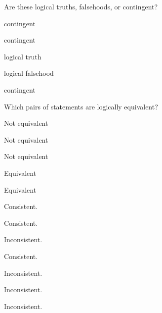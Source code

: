 \documentclass[PHIL101-Textbook.tex]{subfiles}
\begin{document}
Are these logical truths,  falsehoods, or contingent?
\begin{earg}
\item contingent %
\item contingent %
\item logical truth %
\item logical falsehood %
\item contingent %
\end{earg}

Which pairs of statements are logically equivalent?
\begin{earg}
\item Not equivalent %
\item Not equivalent %
\item Not equivalent %
\item Equivalent %
\item Equivalent %
\end{earg}


\begin{earg}
\item Consistent. %
\item Consistent. %
\item Inconsistent. %
\item Consistent. %
\item Inconsistent. %
\item Inconsistent. %
\item Inconsistent. %
\end{earg}
\end{document}
